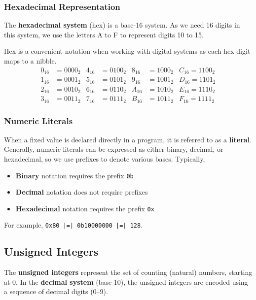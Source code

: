 \documentclass{article}
\begin{document}
\subsubsection{Hexadecimal Representation}
The \textbf{hexadecimal system} (hex) is a base-16 system. As we need 16 digits in this system, we use the letters A to F to represent digits 10 to 15.

Hex is a convenient notation when working with digital systems as each hex digit maps to a nibble.
\begin{align*}
    0_{16} & = 0000_2 & 4_{16} & = 0100_2 & 8_{16} & = 1000_2 & C_{16} = 1100_2 \\
    1_{16} & = 0001_2 & 5_{16} & = 0101_2 & 9_{16} & = 1001_2 & D_{16} = 1101_2 \\
    2_{16} & = 0010_2 & 6_{16} & = 0110_2 & A_{16} & = 1010_2 & E_{16} = 1110_2 \\
    3_{16} & = 0011_2 & 7_{16} & = 0111_2 & B_{16} & = 1011_2 & F_{16} = 1111_2
\end{align*}
\subsubsection{Numeric Literals}
When a fixed value is declared directly in a program, it is referred to as a \textbf{literal}.
Generally, numeric literals can be expressed as either binary, decimal, or hexadecimal, so we
use prefixes to denote various bases. Typically,
\begin{itemize}
    \item \textbf{Binary} notation requires the prefix \texttt{0b}
    \item \textbf{Decimal} notation does not require prefixes
    \item \textbf{Hexadecimal} notation requires the prefix \texttt{0x}
\end{itemize}
For example, \texttt{0x80 |=| 0b10000000 |=| 128}.
\subsection{Unsigned Integers}
The \textbf{unsigned integers} represent the set of counting (natural) numbers, starting at 0.
In the \textbf{decimal system} (base-10), the unsigned integers are encoded using a sequence of decimal digits (0--9).
\end{document}
